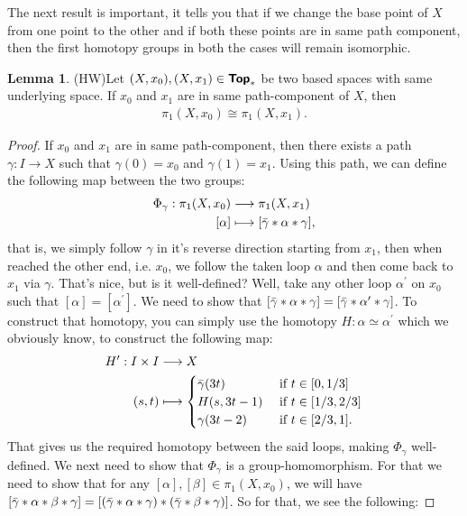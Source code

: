 \documentclass[letterpaper,11pt,twoside]{article}
\theoremstyle{definition}
\theoremstyle{definition}
\theoremstyle{definition}
\theoremstyle{definition}
\newtheorem{lemma}[proposition]{\textbf{Lemma}}
\theoremstyle{definition}
\theoremstyle{definition}
\theoremstyle{remark}
\theoremstyle{definition}
\newcommand{\cat}[1]{{\fontfamily{lmss}\selectfont 
		\text{\textbf{#1}}
}}
\newcommand{\isom}{\cong}
\begin{document}
The next result is important, it tells you that if we change the base point of $X$ from one point to the other and if both these points are in same path component, then the first homotopy groups in both the cases will remain isomorphic.
\begin{lemma}(HW)\label{L-4.2.4}
Let $(X,x_0), (X,x_1)\in \cat{Top}_*$ be two based spaces with same underlying space. If $x_0$ and $x_1$ are in same path-component of $X$, then
\begin{align*}
    \pi_1(X,x_0) \isom \pi_1(X,x_1).
\end{align*}
\end{lemma}
\begin{proof}
    If $x_0$ and $x_1$ are in same path-component, then there exists a path $\gamma : I\to X$ such that $\gamma(0) = x_0$ and $\gamma(1) = x_1$. Using this path, we can define the following map between the two groups:
    \begin{align*}
        \Phi_\gamma : \pi_1(X,x_0) &\longrightarrow \pi_1(X,x_1)\\
        [\alpha] &\longmapsto [\Bar{\gamma}*\alpha * \gamma],
    \end{align*}
    that is, we simply follow $\gamma$ in it's reverse direction starting from $x_1$, then when reached the other end, i.e. $x_0$, we follow the taken loop $\alpha$ and then come back to $x_1$ via $\gamma$. That's nice, but is it well-defined? Well, take any other loop $\alpha^\prime$ on $x_0$ such that $[\alpha] = [\alpha^\prime]$. We need to show that $[\Bar{\gamma}*\alpha * \gamma] = [\Bar{\gamma}*\alpha^\prime*\gamma]$. To construct that homotopy, you can simply use the homotopy $H : \alpha \simeq \alpha^\prime$ which we obviously know, to construct the following map:
    \begin{align*}
        H^\prime : I\times I &\longrightarrow X\\
        (s,t) &\longmapsto \begin{cases}
            \Bar{\gamma}(3t) &\text{ if }t\in [0,1/3]\\
            H(s,3t-1) &\text{ if }t\in [1/3,2/3]\\
            \gamma(3t-2) &\text{ if }t\in [2/3,1]. 
        \end{cases}
    \end{align*}
    That gives us the required homotopy between the said loops, making $\Phi_\gamma$ well-defined. We next need to show that $\Phi_\gamma$ is a group-homomorphism. For that we need to show that for any $[\alpha], [\beta] \in \pi_1(X,x_0)$, we will have $[\Bar{\gamma}*\alpha * \beta * \gamma] = [(\Bar{\gamma}*\alpha * \gamma) *(\Bar{\gamma}*\beta *\gamma)]$. So for that, we see the following:

\end{proof}
\end{document}
